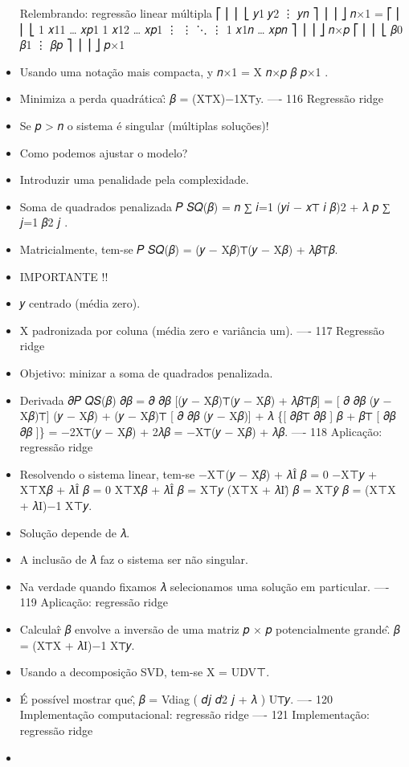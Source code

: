 \documentclass[
]{article}
\begin{document}
\begin{itemize}
  Relembrando: regressão linear múltipla ⎡ ⎢ ⎢ ⎣ 𝑦1 𝑦2 ⋮ 𝑦𝑛 ⎤ ⎥ ⎥ ⎦ 𝑛×1
  = ⎡ ⎢ ⎢ ⎣ 1 𝑥11 \ldots{} 𝑥𝑝1 1 𝑥12 \ldots{} 𝑥𝑝1 ⋮ ⋮ ⋱ ⋮ 1 𝑥1𝑛 \ldots{}
  𝑥𝑝𝑛 ⎤ ⎥ ⎥ ⎦ 𝑛×𝑝 ⎡ ⎢ ⎢ ⎣ 𝛽0 𝛽1 ⋮ 𝛽𝑝 ⎤ ⎥ ⎥ ⎦ 𝑝×1
\item
  Usando uma notação mais compacta, y 𝑛×1 = X 𝑛×𝑝 𝛽 𝑝×1 .
\item
  Minimiza a perda quadrática:̂ 𝛽 = (X⊤X)−1X⊤y. ---- 116 Regressão ridge
\item
  Se 𝑝 \textgreater{} 𝑛 o sistema é singular (múltiplas soluções)!
\item
  Como podemos ajustar o modelo?
\item
  Introduzir uma penalidade pela complexidade.
\item
  Soma de quadrados penalizada 𝑃 𝑆𝑄(𝛽) = 𝑛 ∑ 𝑖=1 (𝑦𝑖 − 𝑥⊤ 𝑖 𝛽)2 + 𝜆 𝑝 ∑
  𝑗=1 𝛽2 𝑗 .
\item
  Matricialmente, tem-se 𝑃 𝑆𝑄(𝛽) = (𝑦 − X𝛽)⊤(𝑦 − X𝛽) + 𝜆𝛽⊤𝛽.
\item
  IMPORTANTE !!
\item
  𝑦 centrado (média zero).
\item
  X padronizada por coluna (média zero e variância um). ---- 117
  Regressão ridge
\item
  Objetivo: minizar a soma de quadrados penalizada.
\item
  Derivada 𝜕𝑃 𝑄𝑆(𝛽) 𝜕𝛽 = 𝜕 𝜕𝛽 {[}(𝑦 − X𝛽)⊤(𝑦 − X𝛽) + 𝜆𝛽⊤𝛽{]} = {[} 𝜕 𝜕𝛽
  (𝑦 − X𝛽)⊤{]} (𝑦 − X𝛽) + (𝑦 − X𝛽)⊤ {[} 𝜕 𝜕𝛽 (𝑦 − X𝛽){]} + 𝜆 \{{[} 𝜕𝛽⊤
  𝜕𝛽 {]} 𝛽 + 𝛽⊤ {[} 𝜕𝛽 𝜕𝛽 {]}\} = −2X⊤(𝑦 − X𝛽) + 2𝜆𝛽 = −X⊤(𝑦 − X𝛽) + 𝜆𝛽.
  ---- 118 Aplicação: regressão ridge
\item
  Resolvendo o sistema linear, tem-se −X⊤(𝑦 − X̂𝛽) + 𝜆Î 𝛽 = 0 −X⊤𝑦 + X⊤X̂𝛽
  + 𝜆Î 𝛽 = 0 X⊤X̂𝛽 + 𝜆Î 𝛽 = X⊤𝑦 (X⊤X + 𝜆I)̂ 𝛽 = X⊤𝑦̂ 𝛽 = (X⊤X + 𝜆I)−1 X⊤𝑦.
\item
  Solução depende de 𝜆.
\item
  A inclusão de 𝜆 faz o sistema ser não singular.
\item
  Na verdade quando fixamos 𝜆 selecionamos uma solução em particular.
  ---- 119 Aplicação: regressão ridge
\item
  Calcular̂ 𝛽 envolve a inversão de uma matriz 𝑝 × 𝑝 potencialmente
  grande.̂ 𝛽 = (X⊤X + 𝜆I)−1 X⊤𝑦.
\item
  Usando a decomposição SVD, tem-se X = UDV⊤.
\item
  É possível mostrar que,̂ 𝛽 = Vdiag ( 𝑑𝑗 𝑑2 𝑗 + 𝜆 ) U⊤𝑦. ---- 120
  Implementação computacional: regressão ridge ---- 121 Implementação:
  regressão ridge
\item

\end{itemize}
\end{document}
